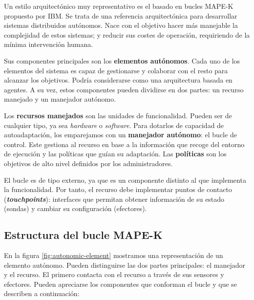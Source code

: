 Un estilo arquitectónico muy representativo es el basado en bucles MAPE-K \cite{ibmcorporationArchitecturalBlueprintAutonomic2006, fonsServiciosAdaptivereadyPara2021} propuesto por IBM. Se trata de una referencia arquitectónica para desarrollar sistemas distribuidos autónomos. Nace con el objetivo hacer más manejable la complejidad de estos sistemas; y reducir sus costes de operación, requiriendo de la mínima intervención humana.

Sus componentes principales son los \textbf{elementos autónomos}. Cada uno de los elementos del sistema es capaz de gestionarse y colaborar con el resto para alcanzar los objetivos. Podría considerarse como una arquitectura basada en agentes. \cite{savaglioAgentbasedInternetThings2020} A su vez, estos componentes pueden dividirse en dos partes: un recurso manejado y un manejador autónomo.

Los \textbf{recursos manejados} son las unidades de funcionalidad. Pueden ser de cualquier tipo, ya sea \emph{hardware} o \emph{software}. Para dotarlos de capacidad de autoadaptación, los emparejamos con un \textbf{manejador autónomo}: el bucle de control. Este gestiona al recurso en base a la información que recoge del entorno de ejecución y las políticas que guían su adaptación. Las \textbf{políticas} son los objetivos de alto nivel definidos por los administradores.

El bucle es de tipo externo, ya que es un componente distinto al que implementa la funcionalidad. Por tanto, el recurso debe implementar puntos de contacto (\textbf{\emph{touchpoints}}): interfaces que permitan obtener información de su estado (sondas) y cambiar su configuración (efectores).

\subsection{Estructura del bucle MAPE-K}
\label{sec:estructura-mape-k}

En la figura \ref{fig:autonomic-element} mostramos una representación de un elemento autónomo. Pueden distinguirse las dos partes principales: el manejador y el recurso. El primero contacta con el recurso a través de sus sensores y efectores. Pueden apreciarse los componentes que conforman el bucle y que se describen a continuación: \cite{ibmcorporationArchitecturalBlueprintAutonomic2006}

